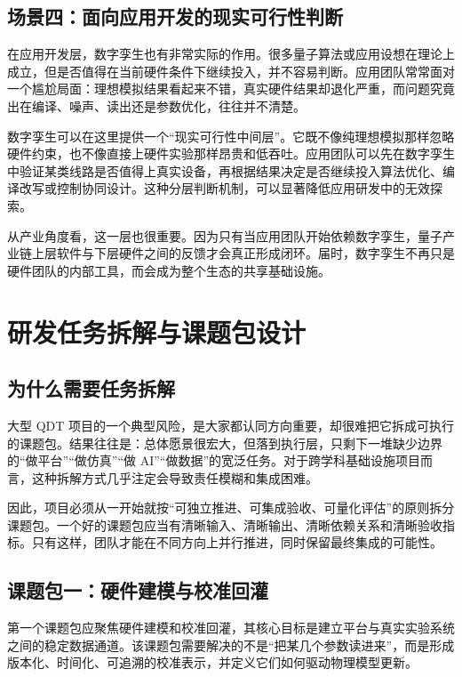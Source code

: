 \documentclass[11pt,a4paper]{article}
\newcommand{\QDT}{QDT}
\begin{document}
\subsection{场景四：面向应用开发的现实可行性判断}

在应用开发层，数字孪生也有非常实际的作用。很多量子算法或应用设想在理论上成立，但是否值得在当前硬件条件下继续投入，并不容易判断。应用团队常常面对一个尴尬局面：理想模拟结果看起来不错，真实硬件结果却退化严重，而问题究竟出在编译、噪声、读出还是参数优化，往往并不清楚。

数字孪生可以在这里提供一个“现实可行性中间层”。它既不像纯理想模拟那样忽略硬件约束，也不像直接上硬件实验那样昂贵和低吞吐。应用团队可以先在数字孪生中验证某类线路是否值得上真实设备，再根据结果决定是否继续投入算法优化、编译改写或控制协同设计。这种分层判断机制，可以显著降低应用研发中的无效探索。

从产业角度看，这一层也很重要。因为只有当应用团队开始依赖数字孪生，量子产业链上层软件与下层硬件之间的反馈才会真正形成闭环。届时，数字孪生不再只是硬件团队的内部工具，而会成为整个生态的共享基础设施。

\section{研发任务拆解与课题包设计}

\subsection{为什么需要任务拆解}

大型 \QDT{} 项目的一个典型风险，是大家都认同方向重要，却很难把它拆成可执行的课题包。结果往往是：总体愿景很宏大，但落到执行层，只剩下一堆缺少边界的“做平台”“做仿真”“做 AI”“做数据”的宽泛任务。对于跨学科基础设施项目而言，这种拆解方式几乎注定会导致责任模糊和集成困难。

因此，项目必须从一开始就按“可独立推进、可集成验收、可量化评估”的原则拆分课题包。一个好的课题包应当有清晰输入、清晰输出、清晰依赖关系和清晰验收指标。只有这样，团队才能在不同方向上并行推进，同时保留最终集成的可能性。

\subsection{课题包一：硬件建模与校准回灌}

第一个课题包应聚焦硬件建模和校准回灌，其核心目标是建立平台与真实实验系统之间的稳定数据通道。该课题包需要解决的不是“把某几个参数读进来”，而是形成版本化、时间化、可追溯的校准表示，并定义它们如何驱动物理模型更新。
\end{document}
